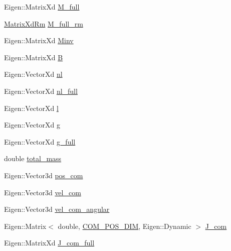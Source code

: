 \begin{DoxyCompactItemize}
\item 
Eigen\+::\+Matrix\+Xd \hyperlink{structOcraWbiModel_1_1OcraWbiModel__pimpl_af57ebe4c5c15477a9592dd91a5c96f12}{M\+\_\+full}
\item 
\hyperlink{namespaceocra__icub_aa5e36a19ed031c28ca83c207bd7dd83f}{Matrix\+Xd\+Rm} \hyperlink{structOcraWbiModel_1_1OcraWbiModel__pimpl_a6ed8d69d83b0321920c0f79cf8e58bde}{M\+\_\+full\+\_\+rm}
\item 
Eigen\+::\+Matrix\+Xd \hyperlink{structOcraWbiModel_1_1OcraWbiModel__pimpl_a4d95e99d368b2e61c2945c1eeabff823}{Minv}
\item 
Eigen\+::\+Matrix\+Xd \hyperlink{structOcraWbiModel_1_1OcraWbiModel__pimpl_a71a78aa74a5b1422df339991ea6c6974}{B}
\item 
Eigen\+::\+Vector\+Xd \hyperlink{structOcraWbiModel_1_1OcraWbiModel__pimpl_aabdfee290923f49af80f11c524bae456}{nl}
\item 
Eigen\+::\+Vector\+Xd \hyperlink{structOcraWbiModel_1_1OcraWbiModel__pimpl_abea2880fe7e4fa2672ce55635ab9ea6c}{nl\+\_\+full}
\item 
Eigen\+::\+Vector\+Xd \hyperlink{structOcraWbiModel_1_1OcraWbiModel__pimpl_acc77ea549dd56164264c9436d8188b50}{l}
\item 
Eigen\+::\+Vector\+Xd \hyperlink{structOcraWbiModel_1_1OcraWbiModel__pimpl_ac9a96e0afe19e395bfadf4a21b6d0f5b}{g}
\item 
Eigen\+::\+Vector\+Xd \hyperlink{structOcraWbiModel_1_1OcraWbiModel__pimpl_a76adc7eb17d82f9234a4f130c2712be5}{g\+\_\+full}
\item 
double \hyperlink{structOcraWbiModel_1_1OcraWbiModel__pimpl_a992e0b522d3e3b9206f90dbcdd4727cf}{total\+\_\+mass}
\item 
Eigen\+::\+Vector3d \hyperlink{structOcraWbiModel_1_1OcraWbiModel__pimpl_acc028d57a70c3b36838f28ea518f65c4}{pos\+\_\+com}
\item 
Eigen\+::\+Vector3d \hyperlink{structOcraWbiModel_1_1OcraWbiModel__pimpl_a96c3cdb51b2a2b69c0738605c30e1b2e}{vel\+\_\+com}
\item 
Eigen\+::\+Vector3d \hyperlink{structOcraWbiModel_1_1OcraWbiModel__pimpl_a696d73e62837978589a2730c8feb325c}{vel\+\_\+com\+\_\+angular}
\item 
Eigen\+::\+Matrix$<$ double, \hyperlink{OcraWbiModel_8cpp_a72cb22de2538ae949cc73fa3d7c33bdc}{C\+O\+M\+\_\+\+P\+O\+S\+\_\+\+D\+IM}, Eigen\+::\+Dynamic $>$ \hyperlink{structOcraWbiModel_1_1OcraWbiModel__pimpl_ab724e92a7f74f03c3842f22129b2ad94}{J\+\_\+com}
\item 
Eigen\+::\+Matrix\+Xd \hyperlink{structOcraWbiModel_1_1OcraWbiModel__pimpl_a73c9391019a2e36ddd2c2f9ef1773a41}{J\+\_\+com\+\_\+full}

\end{DoxyCompactItemize}
